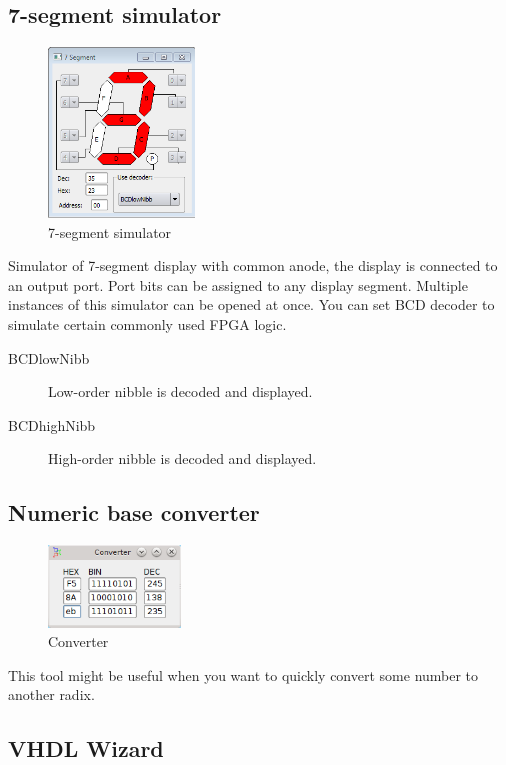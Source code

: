     \subsection{7-segment simulator}
        \begin{figure}
            \centering
            \includegraphics[width=110pt]{img/7seg_sim.png}
            \caption{7-segment simulator}
        \end{figure}
        Simulator of 7-segment display with common anode, the display is connected to an output port. Port bits can be
        assigned to any display segment. Multiple instances of this simulator can be opened at once. You can set BCD decoder to simulate certain commonly used FPGA logic.

        \begin{description}
            \item[BCDlowNibb] Low-order nibble is decoded and displayed.
            \item[BCDhighNibb] High-order nibble is decoded and displayed.
        \end{description}

    \subsection{Numeric base converter}
        \begin{figure}
            \centering
            \includegraphics[width=100pt]{img/converter.png}
            \caption{Converter}
        \end{figure}
        This tool might be useful when you want to quickly convert some number to another radix.

    \clearpage
    \subsection{VHDL Wizard}
        
